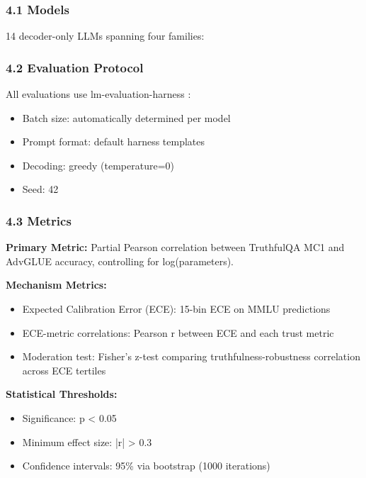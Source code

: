 
\subsubsection{4.1 Models}

14 decoder-only LLMs spanning four families:

\begin{table}[htbp]
\centering
{}
\end{table}

\subsubsection{4.2 Evaluation Protocol}

All evaluations use lm-evaluation-harness \citep{gao2023lmeval}:
\begin{itemize}
\item Batch size: automatically determined per model
\item Prompt format: default harness templates
\item Decoding: greedy (temperature=0)
\item Seed: 42
\end{itemize}

\subsubsection{4.3 Metrics}

\textbf{Primary Metric:} Partial Pearson correlation between TruthfulQA MC1 and AdvGLUE accuracy, controlling for log(parameters).

\textbf{Mechanism Metrics:}
\begin{itemize}
\item Expected Calibration Error (ECE): 15-bin ECE on MMLU predictions
\item ECE-metric correlations: Pearson r between ECE and each trust metric
\item Moderation test: Fisher's z-test comparing truthfulness-robustness correlation across ECE tertiles
\end{itemize}

\textbf{Statistical Thresholds:}
\begin{itemize}
\item Significance: p < 0.05
\item Minimum effect size: |r| > 0.3
\item Confidence intervals: 95\% via bootstrap (1000 iterations)
\end{itemize}
